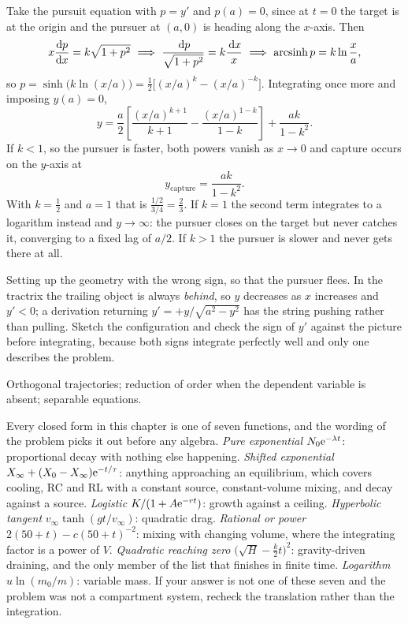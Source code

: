 \begin{worked}
Take the pursuit equation with $p=y'$ and $p(a)=0$, since at $t=0$ the target is at the origin and the pursuer at $(a,0)$ is heading along the $x$-axis. Then
\[x\dv{p}{x}=k\sqrt{1+p^{2}}\ \Longrightarrow\ \frac{\dd p}{\sqrt{1+p^{2}}}=k\frac{\dd x}{x}\ \Longrightarrow\ \operatorname{arcsinh}p=k\ln\frac xa,\]
so $p=\sinh\bigl(k\ln(x/a)\bigr)=\tfrac12\bigl[(x/a)^{k}-(x/a)^{-k}\bigr]$. Integrating once more and imposing $y(a)=0$,
\[y=\frac a2\left[\frac{(x/a)^{k+1}}{k+1}-\frac{(x/a)^{1-k}}{1-k}\right]+\frac{ak}{1-k^{2}}.\]
If $k<1$, so the pursuer is faster, both powers vanish as $x\to0$ and capture occurs on the $y$-axis at
\[y_{\text{capture}}=\frac{ak}{1-k^{2}}.\]
With $k=\tfrac12$ and $a=1$ that is $\tfrac{1/2}{3/4}=\tfrac23$. If $k=1$ the second term integrates to a logarithm instead and $y\to\infty$: the pursuer closes on the target but never catches it, converging to a fixed lag of $a/2$. If $k>1$ the pursuer is slower and never gets there at all.
\end{worked}

\begin{trap}
Setting up the geometry with the wrong sign, so that the pursuer flees. In the tractrix the trailing object is always \emph{behind}, so $y$ decreases as $x$ increases and $y'<0$; a derivation returning $y'=+y/\sqrt{a^{2}-y^{2}}$ has the string pushing rather than pulling. Sketch the configuration and check the sign of $y'$ against the picture before integrating, because both signs integrate perfectly well and only one describes the problem.
\end{trap}

\begin{seealsob}Orthogonal trajectories; reduction of order when the dependent variable is absent; separable equations.\end{seealsob}

\begin{keynote}
Every closed form in this chapter is one of seven functions, and the wording of the problem picks it out before any algebra. \emph{Pure exponential} $N_0\mathrm{e}^{-\lambda t}$: proportional decay with nothing else happening. \emph{Shifted exponential} $X_\infty+(X_0-X_\infty)\mathrm{e}^{-t/\tau}$: anything approaching an equilibrium, which covers cooling, RC and RL with a constant source, constant-volume mixing, and decay against a source. \emph{Logistic} $K/(1+A\mathrm{e}^{-rt})$: growth against a ceiling. \emph{Hyperbolic tangent} $v_\infty\tanh(gt/v_\infty)$: quadratic drag. \emph{Rational or power} $2(50+t)-c(50+t)^{-2}$: mixing with changing volume, where the integrating factor is a power of $V$. \emph{Quadratic reaching zero} $\bigl(\sqrt H-\tfrac k2t\bigr)^{2}$: gravity-driven draining, and the only member of the list that finishes in finite time. \emph{Logarithm} $u\ln(m_0/m)$: variable mass. If your answer is not one of these seven and the problem was not a compartment system, recheck the translation rather than the integration.
\end{keynote}

